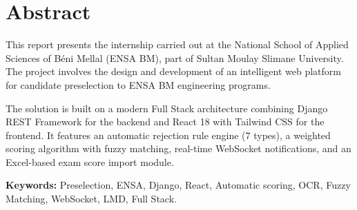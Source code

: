 \chapter*{Abstract}

This report presents the internship carried out at the National School of Applied Sciences of Béni Mellal (ENSA BM), part of Sultan Moulay Slimane University. The project involves the design and development of an intelligent web platform for candidate preselection to ENSA BM engineering programs.

The solution is built on a modern Full Stack architecture combining Django REST Framework for the backend and React 18 with Tailwind CSS for the frontend. It features an automatic rejection rule engine (7 types), a weighted scoring algorithm with fuzzy matching, real-time WebSocket notifications, and an Excel-based exam score import module.

\vspace{0.5cm}
\noindent\textbf{Keywords:} Preselection, ENSA, Django, React, Automatic scoring, OCR, Fuzzy Matching, WebSocket, LMD, Full Stack.

